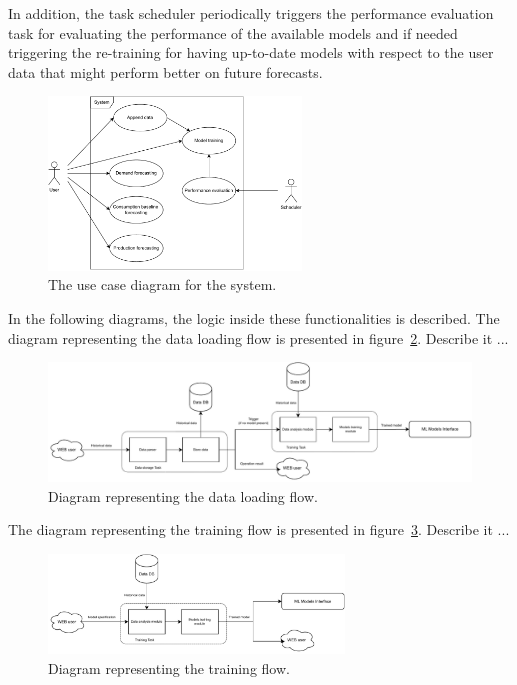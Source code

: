 In addition, the task scheduler periodically triggers the performance evaluation task for evaluating the performance of the available models and if needed triggering the re-training for having up-to-date models with respect to the user data that might perform better on future forecasts.

\begin{figure}[H]
\centering 
\includegraphics[width=0.6\textwidth]{images/architecture_use_case}
\caption{The use case diagram for the system.}
\label{fig:usecase}
\end{figure}

In the following diagrams, the logic inside these functionalities is described.
The diagram representing the data loading flow is presented in figure~\ref{fig:loadingflow}.
Describe it ...

\begin{figure}[H]
\centering 
\includegraphics[width=1\textwidth]{images/architecture_data_loading_flow}
\caption{Diagram representing the data loading flow.}
\label{fig:loadingflow}
\end{figure}

The diagram representing the training flow is presented in figure~\ref{fig:trainingflow}.
Describe it ...

\begin{figure}[H]
\centering 
\includegraphics[width=0.7\textwidth]{images/architecture_training_flow}
\caption{Diagram representing the training flow.}
\label{fig:trainingflow}
\end{figure}

